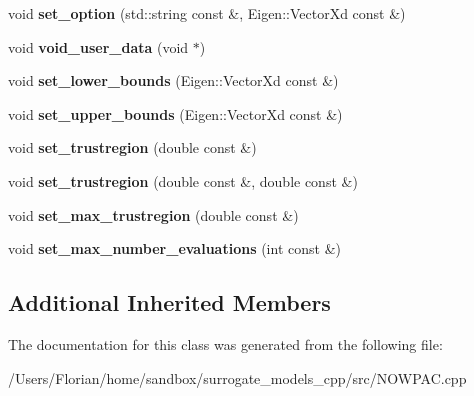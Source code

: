 \begin{DoxyCompactItemize}
\item 
void {\bfseries set\+\_\+option} (std\+::string const \&, Eigen\+::\+Vector\+Xd const \&)\hypertarget{class_n_o_w_p_a_c_afe1d076013c2ff47b4d373c3e74df87c}{}\label{class_n_o_w_p_a_c_afe1d076013c2ff47b4d373c3e74df87c}

\item 
void {\bfseries void\+\_\+user\+\_\+data} (void $\ast$)\hypertarget{class_n_o_w_p_a_c_aa08a81274d3e88e1885fd6d0f0fe7603}{}\label{class_n_o_w_p_a_c_aa08a81274d3e88e1885fd6d0f0fe7603}

\item 
void {\bfseries set\+\_\+lower\+\_\+bounds} (Eigen\+::\+Vector\+Xd const \&)\hypertarget{class_n_o_w_p_a_c_a032c6bf54ff6247323c490a697545acc}{}\label{class_n_o_w_p_a_c_a032c6bf54ff6247323c490a697545acc}

\item 
void {\bfseries set\+\_\+upper\+\_\+bounds} (Eigen\+::\+Vector\+Xd const \&)\hypertarget{class_n_o_w_p_a_c_a6ec5292c0e8efb96e0603c67e9450f3b}{}\label{class_n_o_w_p_a_c_a6ec5292c0e8efb96e0603c67e9450f3b}

\item 
void {\bfseries set\+\_\+trustregion} (double const \&)\hypertarget{class_n_o_w_p_a_c_a06760a23da9f7c44deedb3f4bed1eaac}{}\label{class_n_o_w_p_a_c_a06760a23da9f7c44deedb3f4bed1eaac}

\item 
void {\bfseries set\+\_\+trustregion} (double const \&, double const \&)\hypertarget{class_n_o_w_p_a_c_a9492386a028fdd544e62ecd4da99cb6d}{}\label{class_n_o_w_p_a_c_a9492386a028fdd544e62ecd4da99cb6d}

\item 
void {\bfseries set\+\_\+max\+\_\+trustregion} (double const \&)\hypertarget{class_n_o_w_p_a_c_a7deccb3dc56fc736692c1e793ed1076b}{}\label{class_n_o_w_p_a_c_a7deccb3dc56fc736692c1e793ed1076b}

\item 
void {\bfseries set\+\_\+max\+\_\+number\+\_\+evaluations} (int const \&)\hypertarget{class_n_o_w_p_a_c_a4f4492a60d3f836208ccc909779b8f92}{}\label{class_n_o_w_p_a_c_a4f4492a60d3f836208ccc909779b8f92}

\end{DoxyCompactItemize}
\subsection*{Additional Inherited Members}


The documentation for this class was generated from the following file\+:\begin{DoxyCompactItemize}
\item 
/\+Users/\+Florian/home/sandbox/surrogate\+\_\+models\+\_\+cpp/src/N\+O\+W\+P\+A\+C.\+cpp\end{DoxyCompactItemize}

